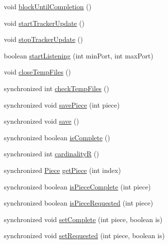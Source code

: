 \begin{DoxyCompactItemize}
\item 
void \hyperlink{classj_bittorrent_a_p_i_1_1_download_manager_aa52ddecb362a7f462dafc8b9181bf61e}{blockUntilCompletion} ()
\item 
void \hyperlink{classj_bittorrent_a_p_i_1_1_download_manager_a5d9bd7a64a0747d9440c5bcffc23e485}{startTrackerUpdate} ()
\item 
void \hyperlink{classj_bittorrent_a_p_i_1_1_download_manager_a6fe29d22cb0d273f57e4ae1889f482f9}{stopTrackerUpdate} ()
\item 
boolean \hyperlink{classj_bittorrent_a_p_i_1_1_download_manager_aef5ce5f1d5f07d30b00f18d52b52c0ec}{startListening} (int minPort, int maxPort)
\item 
void \hyperlink{classj_bittorrent_a_p_i_1_1_download_manager_af9d07141554f5d99cc69d928a62f4bb5}{closeTempFiles} ()
\item 
synchronized int \hyperlink{classj_bittorrent_a_p_i_1_1_download_manager_a8eb7c238409f2d32b62aef6a7a02bbcb}{checkTempFiles} ()
\item 
synchronized void \hyperlink{classj_bittorrent_a_p_i_1_1_download_manager_a2fc9b7a2b7466ed76061ec97d7b0d931}{savePiece} (int piece)
\item 
synchronized void \hyperlink{classj_bittorrent_a_p_i_1_1_download_manager_af5eb8ee54fc43f223e393b3814d0f3e9}{save} ()
\item 
synchronized boolean \hyperlink{classj_bittorrent_a_p_i_1_1_download_manager_a5fc8c9ae5c091bf5e4fd2ee8bbd47072}{isComplete} ()
\item 
synchronized int \hyperlink{classj_bittorrent_a_p_i_1_1_download_manager_a08e44d470aa35a70f47c569e4b65b84b}{cardinalityR} ()
\item 
synchronized \hyperlink{classj_bittorrent_a_p_i_1_1_piece}{Piece} \hyperlink{classj_bittorrent_a_p_i_1_1_download_manager_a2c576788704ea89a2449e470fc02c955}{getPiece} (int index)
\item 
synchronized boolean \hyperlink{classj_bittorrent_a_p_i_1_1_download_manager_a4c5841b55bbd3b45e4fd89d049802579}{isPieceComplete} (int piece)
\item 
synchronized boolean \hyperlink{classj_bittorrent_a_p_i_1_1_download_manager_a98e02f682d704a0aea83859210d561bd}{isPieceRequested} (int piece)
\item 
synchronized void \hyperlink{classj_bittorrent_a_p_i_1_1_download_manager_a77f2cb90c39d9aa0a0917c7221593496}{setComplete} (int piece, boolean is)
\item 
synchronized void \hyperlink{classj_bittorrent_a_p_i_1_1_download_manager_a25c9eae498059d4de7b7642e5cd30498}{setRequested} (int piece, boolean is)

\end{DoxyCompactItemize}
